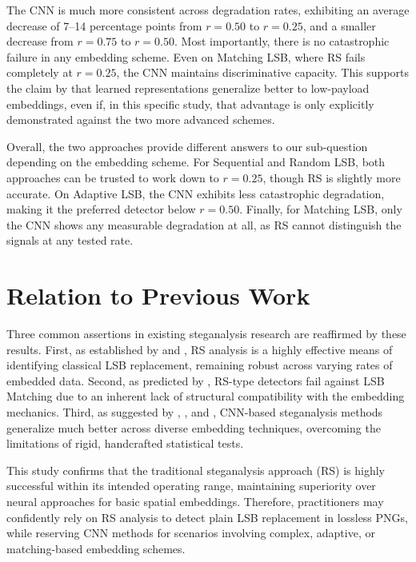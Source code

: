 The CNN is much more consistent across degradation rates, exhibiting an average decrease of 7--14 percentage points from $r = 0.50$ to $r = 0.25$, 
and a smaller decrease from $r = 0.75$ to $r = 0.50$. Most importantly, there is no catastrophic failure in any embedding scheme. 
Even on Matching LSB, where RS fails completely at $r = 0.25$, the CNN maintains discriminative capacity. 
This supports the claim by \textcite{Apau2024} that learned representations generalize better to low-payload embeddings, even if, in this specific study, 
that advantage is only explicitly demonstrated against the two more advanced schemes.

Overall, the two approaches provide different answers to our sub-question depending on the embedding scheme. 
For Sequential and Random LSB, both approaches can be trusted to work down to $r = 0.25$, though RS is slightly more accurate. 
On Adaptive LSB, the CNN exhibits less catastrophic degradation, making it the preferred detector below $r = 0.50$. 
Finally, for Matching LSB, only the CNN shows any measurable degradation at all, as RS cannot distinguish the signals at any tested rate.

\section{Relation to Previous Work}

Three common assertions in existing steganalysis research are reaffirmed by these results. 
First, as established by \textcite{Fridrich2001} and \textcite{Fridrich2002}, RS analysis is a highly effective means of identifying classical 
LSB replacement, remaining robust across varying rates of embedded data. 
Second, as predicted by \textcite{Ker2005}, RS-type detectors fail against LSB Matching due to an inherent lack of structural compatibility with 
the embedding mechanics. 
Third, as suggested by \textcite{Qian2015}, \textcite{Wang2021}, and \textcite{Apau2024}, CNN-based steganalysis methods generalize much better 
across diverse embedding techniques, overcoming the limitations of rigid, handcrafted statistical tests.

This study confirms that the traditional steganalysis approach (RS) is highly successful within its intended operating range, 
maintaining superiority over neural approaches for basic spatial embeddings. 
Therefore, practitioners may confidently rely on RS analysis to detect plain LSB replacement in lossless PNGs, while reserving CNN methods for 
scenarios involving complex, adaptive, or matching-based embedding schemes.

